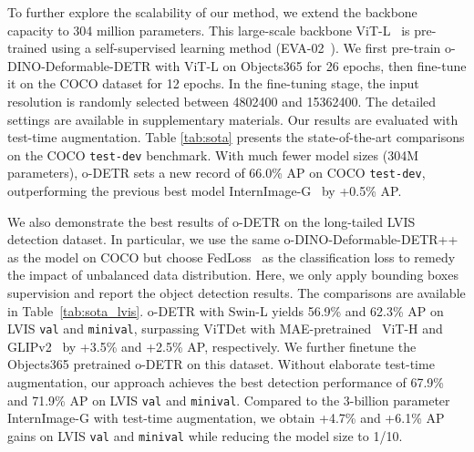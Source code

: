 To further explore the scalability of our method, we extend the backbone capacity to 304 million parameters.
This large-scale backbone ViT-L~\cite{vit} is pre-trained using a self-supervised learning method (EVA-02~\cite{eva02}).
We first pre-train o-DINO-Deformable-DETR with ViT-L on Objects365 for 26 epochs, then fine-tune it on the COCO dataset for 12 epochs.
In the fine-tuning stage, the input resolution is randomly selected between 4802400 and 15362400.
The detailed settings are available in supplementary materials.
Our results are evaluated with test-time augmentation. 
Table \ref{tab:sota} presents the state-of-the-art comparisons on the COCO \texttt{test-dev} benchmark.
With much fewer model sizes (304M parameters), o-DETR sets a new record of 66.0\% AP on COCO \texttt{test-dev}, outperforming the previous best model InternImage-G~\cite{intern} by +0.5\% AP.

We also demonstrate the best results of o-DETR on the long-tailed LVIS detection dataset.
In particular, we use the same o-DINO-Deformable-DETR++ as the model on COCO but choose FedLoss~\cite{centernet2} as the classification loss to remedy the impact of unbalanced data distribution.
Here, we only apply bounding boxes supervision and report the object detection results.
The comparisons are available in Table~\ref{tab:sota_lvis}.
o-DETR with Swin-L yields 56.9\% and 62.3\% AP on LVIS \texttt{val} and \texttt{minival}, surpassing ViTDet with MAE-pretrained~\cite{mae} ViT-H and GLIPv2~\cite{glipv2} by +3.5\% and +2.5\% AP, respectively.
We further finetune the Objects365 pretrained o-DETR on this dataset.
Without elaborate test-time augmentation, our approach achieves the best detection performance of 67.9\% and 71.9\% AP on LVIS \texttt{val} and \texttt{minival}.
Compared to the 3-billion parameter InternImage-G with test-time augmentation, we obtain +4.7\% and +6.1\% AP gains on LVIS \texttt{val} and \texttt{minival} while reducing the model size to 1/10.


